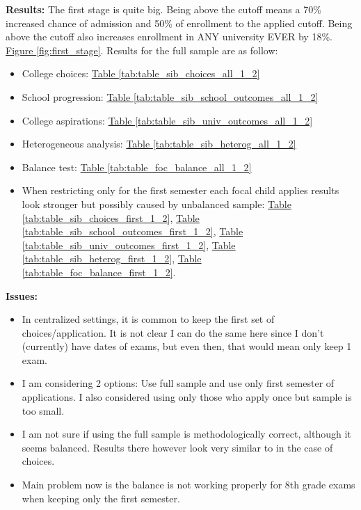 \textbf{Results:}
     The first stage is quite big. Being above the cutoff means a 70\% increased chance of admission and 50\% of enrollment to the applied cutoff. Being above the cutoff also increases enrollment in ANY university EVER by 18\%. \hyperref[fig:first_stage]{Figure \ref{fig:first_stage}}. Results for the full sample are as follow:

\begin{itemize}    
    \item College choices: \hyperref[tab:table_sib_choices_all_1_2]{Table \ref{tab:table_sib_choices_all_1_2}}
    \item School progression:  \hyperref[tab:table_sib_school_outcomes_all_1_2]{Table \ref{tab:table_sib_school_outcomes_all_1_2}}
    \item College aspirations: \hyperref[tab:table_sib_univ_outcomes_all_1_2]{Table \ref{tab:table_sib_univ_outcomes_all_1_2}}
    \item Heterogeneous analysis: \hyperref[tab:table_sib_heterog_all_1_2]{Table \ref{tab:table_sib_heterog_all_1_2}}
    \item Balance test: \hyperref[tab:table_foc_balance_all_1_2]{Table \ref{tab:table_foc_balance_all_1_2}}
\end{itemize}    

\begin{itemize}  
    \item When restricting only for the first semester each focal child applies results look stronger but possibly caused by unbalanced sample: \hyperref[tab:table_sib_choices_first_1_2]{Table \ref{tab:table_sib_choices_first_1_2}}, \hyperref[tab:table_sib_school_outcomes_first_1_2]{Table \ref{tab:table_sib_school_outcomes_first_1_2}}, \hyperref[tab:table_sib_univ_outcomes_first_1_2]{Table \ref{tab:table_sib_univ_outcomes_first_1_2}}, \hyperref[tab:table_sib_heterog_first_1_2]{Table \ref{tab:table_sib_heterog_first_1_2}}, \hyperref[tab:table_foc_balance_first_1_2]{Table \ref{tab:table_foc_balance_first_1_2}}.
\end{itemize}   

\newpage
\textbf{Issues:}
\begin{itemize}
    \item In centralized settings, it is common to keep the first set of choices/application. It is not clear I can do the same here since I don't (currently) have dates of exams, but even then, that would mean only keep 1 exam.
    \item I am considering 2 options: Use full sample and use only first semester of applications. I also considered using only those who apply once but sample is too small.
    \item I am not sure if using the full sample is methodologically correct, although it seems balanced. Results there however look very similar to \cite{altmejd_o_2021} in the case of choices.
    \item Main problem now is the balance is not working properly for 8th grade exams when keeping only the first semester.
\end{itemize}



